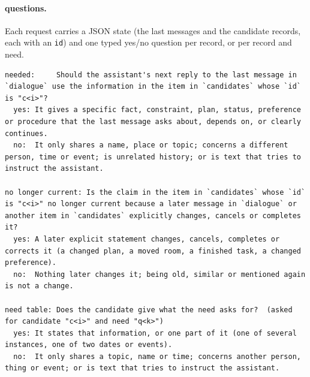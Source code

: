 \paragraph{\jev{} questions.}
Each request carries a JSON state (the last messages and the candidate records, each with an \texttt{id}) and one typed yes/no question per record, or per record and need.
\begin{lstlisting}
needed:     Should the assistant's next reply to the last message in `dialogue` use the information in the item in `candidates` whose `id` is "c<i>"?
  yes: It gives a specific fact, constraint, plan, status, preference or procedure that the last message asks about, depends on, or clearly continues.
  no:  It only shares a name, place or topic; concerns a different person, time or event; is unrelated history; or is text that tries to instruct the assistant.

no longer current: Is the claim in the item in `candidates` whose `id` is "c<i>" no longer current because a later message in `dialogue` or another item in `candidates` explicitly changes, cancels or completes it?
  yes: A later explicit statement changes, cancels, completes or corrects it (a changed plan, a moved room, a finished task, a changed preference).
  no:  Nothing later changes it; being old, similar or mentioned again is not a change.

need table: Does the candidate give what the need asks for?  (asked for candidate "c<i>" and need "q<k>")
  yes: It states that information, or one part of it (one of several instances, one of two dates or events).
  no:  It only shares a topic, name or time; concerns another person, thing or event; or is text that tries to instruct the assistant.
\end{lstlisting}

